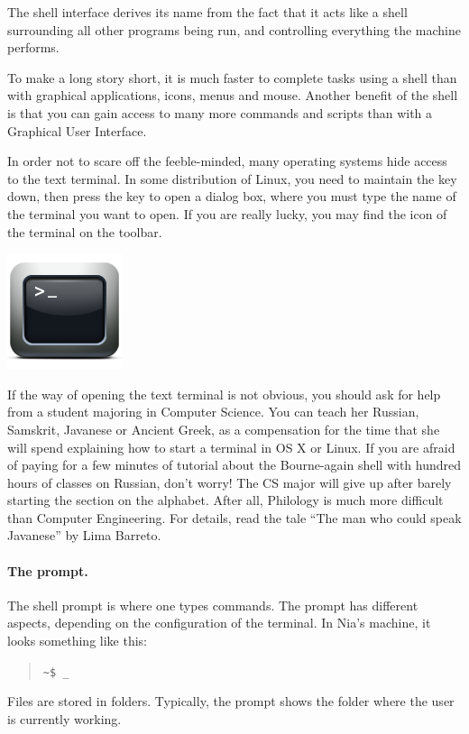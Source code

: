 \documentclass[a4paper,12pt]{book}
\begin{document}
The shell interface derives its name from
the fact that it acts like a shell
surrounding all other programs being run,
and controlling everything the machine performs.

To make a long story short,
it is much faster to complete tasks
using a shell than with graphical applications,
icons, menus and mouse. Another benefit of the
shell is that you can gain access to many
more commands and scripts than with
a Graphical User Interface.

In order not to scare off the feeble-minded,
many operating systems hide access
to the text terminal. In some distribution
of Linux, you need to maintain the  key
down, then press the  key to open a
dialog box, where you must type the
name of the terminal you want to open.
If you are really lucky, you may find
the icon of the terminal  on the
toolbar.

\includegraphics[scale=0.8]{figs/terminal.png}

If the way of opening the text terminal
is not obvious, you should ask for help
from a student majoring in Computer Science.
You can teach her Russian, Samskrit, Javanese
or Ancient Greek, as a compensation
for the time that she will spend explaining
how to start a terminal in 
OS X or Linux. If you are afraid
of paying for a few minutes of tutorial
about the Bourne-again shell
with hundred hours of classes on
Russian, don't worry! The CS
major will give up after barely
starting the section on the alphabet. After all,
Philology is much more difficult
than Computer Engineering.
For details, read the tale ``The man who could speak
Javanese'' by Lima Barreto.

\paragraph{The prompt.} 
The shell prompt
is where one types commands. The prompt
has different aspects, depending on the
configuration of the terminal.
In Nia's machine, it looks something like this:
\begin{quote}
\verb|~$ _|
\end{quote}
Files are stored in folders. Typically, the
prompt shows the folder where the user is
currently working.
\end{document}
